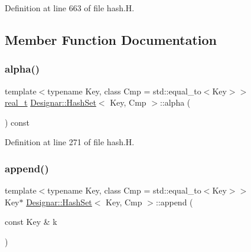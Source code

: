 Definition at line 663 of file hash.\+H.



\subsection{Member Function Documentation}
\mbox{\label{class_designar_1_1_hash_set_a83376ba0b923d00ffbe1d12c093bc2ae}} 
\subsubsection{\texorpdfstring{alpha()}{alpha()}}
{\footnotesize\ttfamily template$<$typename Key, class Cmp = std\+::equal\+\_\+to$<$\+Key$>$$>$ \\
\hyperlink{namespace_designar_aca2c32af26808dbec1f3a3071fad25ce}{real\+\_\+t} \hyperlink{class_designar_1_1_hash_set}{Designar\+::\+Hash\+Set}$<$ Key, Cmp $>$\+::alpha (\begin{DoxyParamCaption}{ }\end{DoxyParamCaption}) const\hspace{0.3cm}{\ttfamily [inline]}}



Definition at line 271 of file hash.\+H.

\mbox{\label{class_designar_1_1_hash_set_a6ce31d6797f5f864b9a6906b6a1b9eb6}} 
\subsubsection{\texorpdfstring{append()}{append()}\hspace{0.1cm}{\footnotesize\ttfamily [1/2]}}
{\footnotesize\ttfamily template$<$typename Key, class Cmp = std\+::equal\+\_\+to$<$\+Key$>$$>$ \\
Key$\ast$ \hyperlink{class_designar_1_1_hash_set}{Designar\+::\+Hash\+Set}$<$ Key, Cmp $>$\+::append (\begin{DoxyParamCaption}\item[{const Key \&}]{k }\end{DoxyParamCaption})\hspace{0.3cm}{\ttfamily [inline]}}



